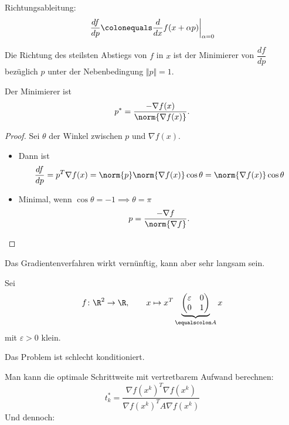 Richtungsableitung:
\begin{equation*}
 \dfrac{df}{dp} \colonequals \dfrac{d}{dx} f(x+\alpha p) \bigg|_{\alpha =0}
\end{equation*}
\begin{defi}
Die Richtung des steilsten Abstiegs von $f$ in $x$ ist der Minimierer von $\dfrac{df}{dp}$ bezüglich $p$ unter der Nebenbedingung $\Vert p \Vert =1$.
\end{defi}
\begin{lemma}
Der Minimierer ist
\begin{equation*}
 p^*=\frac{-\nabla f(x)}{\norm{\nabla f(x)}}.
\end{equation*}
\end{lemma}
\begin{proof}
Sei $\theta$ der Winkel zwischen $p$ und $\nabla f(x)$.
\begin{itemize}
 \item Dann ist
  \begin{equation*}
   \dfrac{df}{dp}=p^T \nabla f(x)=\norm{p} \norm{\nabla f(x)} \cos \theta = \norm{\nabla f(x)} \cos \theta
  \end{equation*}
 \item Minimal, wenn $\cos \theta =-1 \implies \theta = \pi$
  \begin{equation*}
   p=\frac{- \nabla f}{\norm{\nabla f}}.
   \qedhere
 \end{equation*}
\end{itemize}
\end{proof}

Das Gradientenverfahren wirkt vernünftig, kann aber sehr langsam sein.
\begin{bsp}
Sei
\begin{equation*}
 f \colon \R^2 \to \R,
 \qquad
 x \mapsto x^T \underbrace{\begin{pmatrix}
		\varepsilon & 0 \\
		0 & 1 \\
	\end{pmatrix}}_{\equalscolon A}x
\end{equation*}
mit $\varepsilon > 0$ klein.

\begin{bem}
Das Problem ist schlecht konditioniert.
\end{bem}

Man kann die optimale Schrittweite mit vertretbarem Aufwand berechnen:
\begin{equation*}
 t^*_k = \frac{\nabla f (x^k )^T \nabla f (x^k )}{\nabla f (x^k )^T A \nabla f (x^k )}
\end{equation*}
Und dennoch:

\end{bsp}

